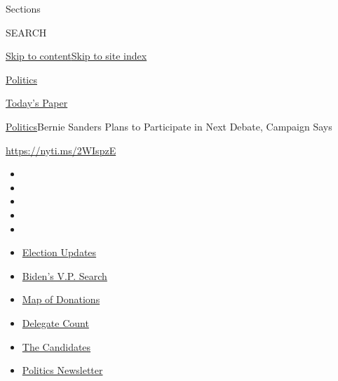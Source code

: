 Sections

SEARCH

\protect\hyperlink{site-content}{Skip to
content}\protect\hyperlink{site-index}{Skip to site index}

\href{https://www.nytimes.com/section/politics}{Politics}

\href{https://myaccount.nytimes.com/auth/login?response_type=cookie\&client_id=vi}{}

\href{https://www.nytimes.com/section/todayspaper}{Today's Paper}

\href{/section/politics}{Politics}\textbar{}Bernie Sanders Plans to
Participate in Next Debate, Campaign Says

\url{https://nyti.ms/2WIspzE}

\begin{itemize}
\item
\item
\item
\item
\item
\end{itemize}

\begin{itemize}
\item
  \href{https://www.nytimes.com/2020/07/31/us/elections/biden-vs-trump.html?action=click\&pgtype=Article\&state=default\&region=TOP_BANNER\&context=storylines_menu}{Election
  Updates}
\item
  \href{https://www.nytimes.com/article/biden-vice-president-2020.html?action=click\&pgtype=Article\&state=default\&region=TOP_BANNER\&context=storylines_menu}{Biden's
  V.P. Search}
\item
  \href{https://www.nytimes.com/interactive/2020/07/24/us/politics/trump-biden-campaign-donors.html?action=click\&pgtype=Article\&state=default\&region=TOP_BANNER\&context=storylines_menu}{Map
  of Donations}
\item
  \href{https://www.nytimes.com/interactive/2020/us/elections/delegate-count-primary-results.html?action=click\&pgtype=Article\&state=default\&region=TOP_BANNER\&context=storylines_menu}{Delegate
  Count}
\item
  \href{https://www.nytimes.com/interactive/2019/us/politics/2020-presidential-candidates.html?action=click\&pgtype=Article\&state=default\&region=TOP_BANNER\&context=storylines_menu}{The
  Candidates}
\item
  \href{https://www.nytimes.com/newsletters/politics?action=click\&pgtype=Article\&state=default\&region=TOP_BANNER\&context=storylines_menu}{Politics
  Newsletter}
\end{itemize}

